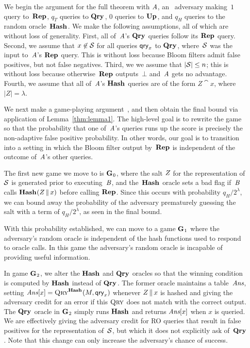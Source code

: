 We begin the argument for the full theorem with $\mathit{A}$, an \errep\ adversary
making~$1$ query to~$\textup{\textbf{Rep}}\hspace{0.5pt}$, $q_T$ queries to $\textup{\textbf{Qry}}\hspace{0.5pt}$, $0$ queries to $\textup{\textbf{Up}}\hspace{0.5pt}$,
and $q_H$ queries to the random oracle~$\textup{\textbf{Hash}}\hspace{0.5pt}$.
%
We make the following assumptions, all of which are without loss of generality.
%
First, all of~$\mathit{A}$'s $\textup{\textbf{Qry}}\hspace{0.5pt}$ queries follow its $\textup{\textbf{Rep}}\hspace{0.5pt}$ query.
%
Second, we assume that $x\not\in\mathcal{S}$ for all queries $\mathsf{qry}_x$ to $\textup{\textbf{Qry}}\hspace{0.5pt}$,
where~$\mathcal{S}$ was the input to~$\mathit{A}$'s $\textup{\textbf{Rep}}\hspace{0.5pt}$ query. This is without loss
because Bloom filters admit false positives, but not false negatives.
%
Third, we we assume that $|\mathcal{S}| \leq n$; this is without loss because
otherwise~$\textup{\textbf{Rep}}\hspace{0.5pt}$ outputs~$\bot$ and~$\mathit{A}$ gets no advantage.
%
Fourth, we assume that all of~$\mathit{A}$'s $\textup{\textbf{Hash}}\hspace{0.5pt}$ queries are of the form $Z\cat
x$, where $|Z| = \lambda$.

We next make a game-playing argument~\cite{bellare2006triple}, and then obtain the
final bound via application of Lemma~\ref{thm:lemma1}.
%
The high-level goal is to rewrite the game so that the probability that one
of~$\mathit{A}$'s queries runs up the score is precisely the non-adaptive false
positive probability.
%
In other words, our goal is to transition into a setting in which the Bloom
filter output by~$\textup{\textbf{Rep}}\hspace{0.5pt}$ is independent of the outcome of~$\mathit{A}$'s other
queries.

The first new game we move to is $\textup{\textbf{G}}\hspace{0.5pt}_0$, where the salt $Z$ for the
representation of~$\mathcal{S}$ is generated prior to executing~$\mathit{B}$, and
the~$\textup{\textbf{Hash}}\hspace{0.5pt}$ oracle sets a bad flag if~$\mathit{B}$ calls $\textup{\textbf{Hash}}\hspace{0.5pt}(Z \, \| \, x)$
before calling $\textup{\textbf{Rep}}\hspace{0.5pt}$. Since this occurs with probability $q_H/2^\lambda$, we
can bound away the probability of the adversary prematurely guessing the salt
with a term of $q_H/2^\lambda$, as seen in the final bound.

With this probability established, we can move to a game $\textup{\textbf{G}}\hspace{0.5pt}_1$ where the
adversary's random oracle is independent of the hash functions used to respond
to oracle calls. In this game the adversary's random oracle is incapable of
providing useful information.

In game $\textup{\textbf{G}}\hspace{0.5pt}_2$, we alter the $\textup{\textbf{Hash}}\hspace{0.5pt}$ and $\textup{\textbf{Qry}}\hspace{0.5pt}$ oracles so that
the winning condition is computed by $\textup{\textbf{Hash}}\hspace{0.5pt}$ instead of $\textup{\textbf{Qry}}\hspace{0.5pt}$. The former
oracle maintains a table~$\textit{Ans}$, setting $\textit{Ans}[x] = \textnormal{\textsc{Qry}}^\textup{\textbf{Hash}}\hspace{0.5pt}(M, \mathsf{qry}_x)$
whenever $Z \, \| \, x$ is hashed and giving the adversary credit for an error
if this $\textnormal{\textsc{Qry}}$ does not match with the correct output. The $\textup{\textbf{Qry}}\hspace{0.5pt}$ oracle in
$\textup{\textbf{G}}\hspace{0.5pt}_2$ simply runs $\textup{\textbf{Hash}}\hspace{0.5pt}$ and returns $\textit{Ans}[x]$ when $x$ is queried.
%
We are effectively giving the adversary credit for RO queries that result in
false positives for the representation of~$\mathcal{S}$, but which it does not
explicitly ask of~$\textup{\textbf{Qry}}\hspace{0.5pt}$. Note that this change can only increase the
adversary's chance of success.

